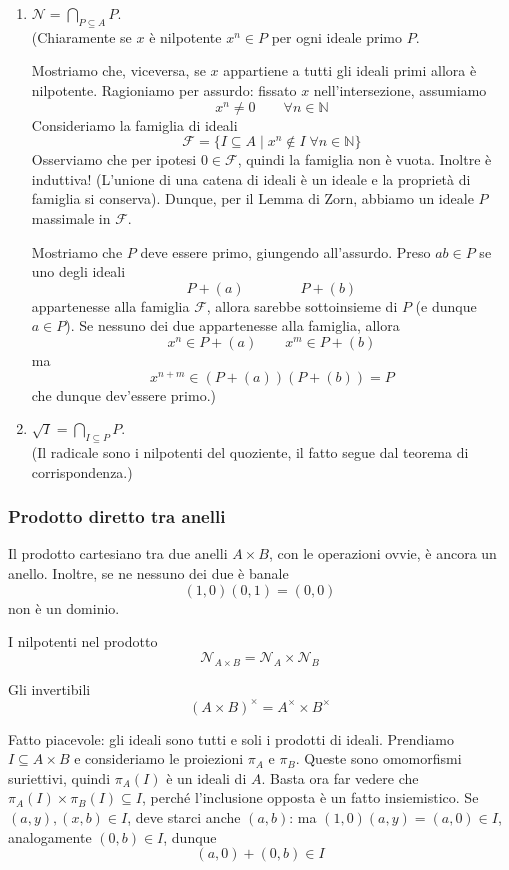\begin{multicols}{2}
\begin{enumerate}
	\item $ \mathcal{N} = \bigcap_{P \subseteq A} P $. \\ (Chiaramente se $ x $ è nilpotente $ x ^n \in P $ per ogni ideale primo $ P $.
	
	Mostriamo che, viceversa, se $ x $ appartiene a tutti gli ideali primi allora è nilpotente. Ragioniamo per assurdo: fissato $ x $ nell'intersezione, assumiamo $$  x^n \neq 0 \qquad \forall n \in \mathbb{N} $$ Consideriamo la famiglia di ideali
	$$  \mathcal{F} = \{ I \subseteq A \mid x^n \notin I \;\forall n \in \mathbb{N}  \}  $$
	Osserviamo che per ipotesi $ {0} \in \mathcal{F} $, quindi la famiglia non è vuota. Inoltre è induttiva! (L'unione di una catena di ideali è un ideale e la proprietà di famiglia si conserva). Dunque, per il Lemma di Zorn, abbiamo un ideale $ P $ massimale in $ \mathcal F $.
	
	Mostriamo che $ P $ deve essere primo, giungendo all'assurdo. Preso $ ab \in P $ se uno degli ideali 
	\[ P + (a) \qquad \qquad P + (b) \]
	appartenesse alla famiglia $ \mathcal{F} $, allora sarebbe sottoinsieme di $ P $ (e dunque $ a \in P $). Se nessuno dei due appartenesse alla famiglia, allora
	\[ x^n \in P + (a) \qquad x^m \in P + (b) \]
	ma
	\[ x^{n + m} \in (P + (a))(P + (b)) = P \]
	che dunque dev'essere primo.)
	
	\item $ \sqrt{I} = \bigcap_{I \subseteq P} P $. \\ (Il radicale sono i nilpotenti del quoziente, il fatto segue dal teorema di corrispondenza.)
	
\end{enumerate}

\subsubsection{Prodotto diretto tra anelli} Il prodotto cartesiano tra due anelli $ A \times B $, con le operazioni ovvie, è ancora un anello. Inoltre, se ne nessuno dei due è banale \[ (1, 0)(0, 1) = (0, 0) \] non è un dominio.

I nilpotenti nel prodotto
\[ \mathcal{N}_{A \times B} = \mathcal{N}_A \times \mathcal{N}_B \]

Gli invertibili
\[ (A\times B)^\times = A^\times \times B^\times  \]

Fatto piacevole: gli ideali sono tutti e soli i prodotti di ideali. Prendiamo $ I \subseteq A \times B $ e consideriamo le proiezioni $ \pi_A $ e $ \pi_B $. Queste sono omomorfismi suriettivi, quindi $ \pi_A(I) $ è un ideali di $ A $. Basta ora far vedere che $ \pi_A(I) \times \pi_B(I) \subseteq I $, perché l'inclusione opposta è un fatto insiemistico. Se $ (a, y), (x, b) \in I $, deve starci anche $ (a, b) $: ma $ (1, 0)(a, y) = (a, 0) \in I $, analogamente $ (0, b) \in I $, dunque
\[ (a, 0) + (0, b) \in I \]


\end{multicols}
